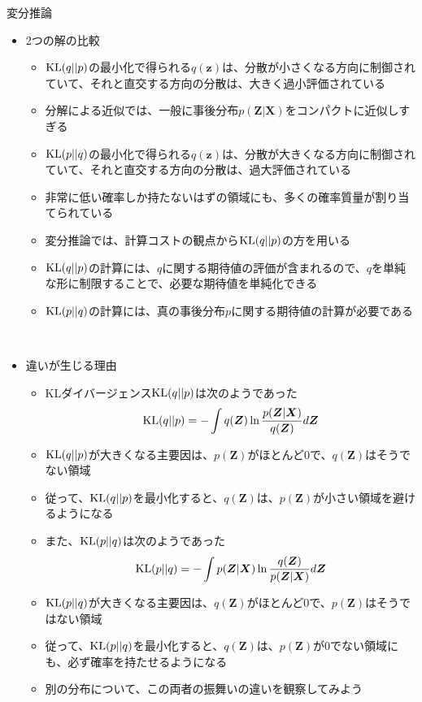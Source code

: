 \documentclass[dvipdfmx,notheorems,t]{beamer}
\begin{document}
\begin{frame}{変分推論}

\begin{itemize}
	\item 2つの解の比較
	\begin{itemize}
		\item $\operatorname{KL}(q || p)$の最小化で得られる$q(\bm{z})$は、\alert{分散が小さくなる方向に制御されていて}、それと直交する方向の分散は、大きく過小評価されている
		\item 分解による近似では、一般に事後分布$p(\bm{Z} | \bm{X})$を\alert{コンパクトに近似しすぎる}
		\newline
		\item $\operatorname{KL}(p || q)$の最小化で得られる$q(\bm{z})$は、\alert{分散が大きくなる方向に制御されていて}、それと直交する方向の分散は、過大評価されている
		\item 非常に低い確率しか持たないはずの領域にも、多くの確率質量が割り当てられている
		\newline
		\item 変分推論では、計算コストの観点から$\operatorname{KL}(q || p)$の方を用いる
		\item $\operatorname{KL}(q || p)$の計算には、$q$に関する期待値の評価が含まれるので、$q$を単純な形に制限することで、必要な期待値を単純化できる
		\item $\operatorname{KL}(p || q)$の計算には、真の事後分布$p$に関する期待値の計算が必要である
	\end{itemize} \
	
	\item 違いが生じる理由
	\begin{itemize}
		\item KLダイバージェンス$\operatorname{KL}(q || p)$は次のようであった
		\begin{equation}
			\operatorname{KL}(q || p) = -\int q(\bm{Z}) \ln \frac{p(\bm{Z} | \bm{X})}{q(\bm{Z})} d\bm{Z}
		\end{equation}
		
		\item $\operatorname{KL}(q || p)$が大きくなる主要因は、$p(\bm{Z})$がほとんど$0$で、$q(\bm{Z})$はそうでない領域
		\item 従って、$\operatorname{KL}(q || p)$を最小化すると、$q(\bm{Z})$は、\color{red}$p(\bm{Z})$が小さい領域を避けるようになる\normalcolor
		\newline
		\item また、$\operatorname{KL}(p || q)$は次のようであった
		\begin{equation}
			\operatorname{KL}(p || q) = -\int p(\bm{Z} | \bm{X}) \ln \frac{q(\bm{Z})}{p(\bm{Z} | \bm{X})} d\bm{Z}
		\end{equation}
		
		\item $\operatorname{KL}(p || q)$が大きくなる主要因は、$q(\bm{Z})$がほとんど$0$で、$p(\bm{Z})$はそうではない領域
		\item 従って、$\operatorname{KL}(p || q)$を最小化すると、$q(\bm{Z})$は、\color{red}$p(\bm{Z})$が$0$でない領域にも、必ず確率を持たせるようになる\normalcolor
		\newline
		\item 別の分布について、この両者の振舞いの違いを観察してみよう
	\end{itemize}
\end{itemize}

\end{frame}
\end{document}
